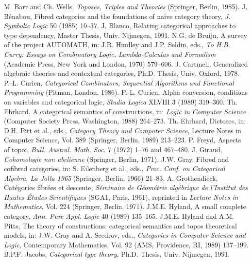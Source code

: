 \documentclass{article}
\theoremstyle{plain}
\theoremstyle{remark}
\begin{document}
\begin{thebibliography}{99}
 M. Barr and Ch. Wells, \emph{Toposes, Triples and Theories} (Springer, Berlin, 1985).
 J. Bénabou, Fibred categories and the foundations of naive category theory, \emph{J. Symbolic Logic} 50 (1985) 10--37.
 J. Blanco, Relating categorical approaches to type dependency, Master Thesis, Univ. Nijmegen, 1991.
 N.G. de Bruijn, A survey of the project AUTOMATH, in: J.R. Hindley and J.P. Seldin, eds., \emph{To H.B. Curry: Essays on Combinatory Logic, Lambda-Calculus and Formalism} (Academic Press, New York and London, 1970) 579--606.
 J. Cartmell, Generalized algebraic theories and contextual categories, Ph.D. Thesis, Univ. Oxford, 1978.
 P.-L. Curien, \emph{Categorical Combinators, Sequential Algorithms and Functional Programming} (Pitman, London, 1986).
 P.-L. Curien, Alpha conversion, conditions on variables and categorical logic, \emph{Studia Logica} XLVIII 3 (1989) 319--360.
 Th. Ehrhard, A categorical semantics of constructions, in: \emph{Logic in Computer Science} (Computer Society Press, Washington, 1988) 264--273.
 Th. Ehrhard, Dictoses, in: D.H. Pitt et al., eds., \emph{Category Theory and Computer Science}, Lecture Notes in Computer Science, Vol. 389 (Springer, Berlin, 1989) 213--223.
 P. Freyd, Aspects of topoi, \emph{Bull. Austral. Math. Soc.} 7 (1972) 1--76 and 467--480.
 J. Giraud, \emph{Cohomologie non abelienne} (Springer, Berlin, 1971).
 J.W. Gray, Fibred and cofibred categories, in: S. Eilenberg et al., eds., \emph{Proc. Conf. on Categorical Algebra, La Jolla 1965} (Springer, Berlin, 1966) 21--83.
 A. Grothendieck, Catégories fibrées et descente, \emph{Séminaire de Géométrie algébrique de l’Institut des Hautes Études Scientifiques} (SGA1, Paris, 1961), reprinted in \emph{Lecture Notes in Mathematics}, Vol. 224 (Springer, Berlin, 1971).
 J.M.E. Hyland, A small complete category, \emph{Ann. Pure Appl. Logic} 40 (1989) 135--165.
 J.M.E. Hyland and A.M. Pitts, The theory of constructions: categorical semantics and topos theoretical models, in: J.W. Gray and A. Scedrov, eds., \emph{Categories in Computer Science and Logic}, Contemporary Mathematics, Vol. 92 (AMS, Providence, RI, 1989) 137--199.
 B.P.F. Jacobs, \emph{Categorical type theory}, Ph.D. Thesis, Univ. Nijmegen, 1991.

\end{thebibliography}
\end{document}
